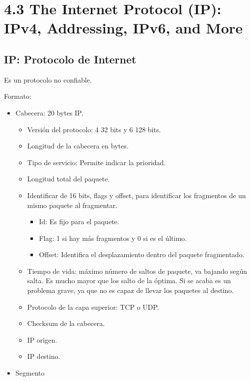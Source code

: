 \documentclass[12pt, twoside, openright]{report} %
\begin{document}
\section{4.3 The Internet Protocol (IP): IPv4, Addressing, IPv6, and More}
\subsection{IP: Protocolo de Internet}

Es un protocolo no confiable.

Formato:
\begin{figure}[H]
	{\def\svgwidth{\textwidth}
		}
\end{figure}
\begin{itemize}
	\item Cabecera: 20 bytes IP.

	      \begin{itemize}
		      \item Versión del protocolo: 4 32 bits y 6 128 bits.
		      \item Longitud de la cabecera en bytes.
		      \item Tipo de servicio: Permite indicar la prioridad.
		      \item Longitud total del paquete.
		      \item Identificar de 16 bits, flags y offset, para identificar los
		            fragmentos de un mismo paquete al fragmentar.

		            \begin{itemize}
			            \item Id: Es fijo para el paquete.
			            \item Flag: 1 si hay más fragmentos y 0 si es el último.
			            \item Offset: Identifica el desplazamiento dentro del paquete
			                  fragmentado.
		            \end{itemize}
		      \item Tiempo de vida: máximo número de saltos de paquete, va bajando
		            según salta. Es mucho mayor que los salto de la óptima. Si se
		            acaba es un problema grave, ya que no es capaz de llevar los
		            paquetes al destino.
		      \item Protocolo de la capa superior: TCP o UDP.
		      \item Checksum de la cabecera.
		      \item IP origen.
		      \item IP destino.
	      \end{itemize}
	\item Segmento
\end{itemize}
\end{document}
